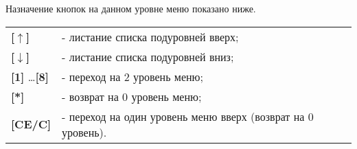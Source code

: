 Назначение кнопок на данном уровне меню показано ниже.
\begin{center}
	\begin{tabular}{p{2.5cm} p{14.5cm}}
	    \textbf{[$\uparrow$]} & - листание списка подуровней вверх; 	\tabularnewline
	    \textbf{[$\downarrow$]} & - листание списка подуровней вниз; 	\tabularnewline
	    \textbf{[1]} \ldots \textbf{[8]} & - переход на 2 уровень меню; \tabularnewline
	    \textbf{[*]} & - возврат на 0 уровень меню; 					\tabularnewline
	    \textbf{[CE/C]} & - переход на один уровень меню вверх (возврат на 0 уровень). \tabularnewline				
	\end{tabular} 
\end{center}


